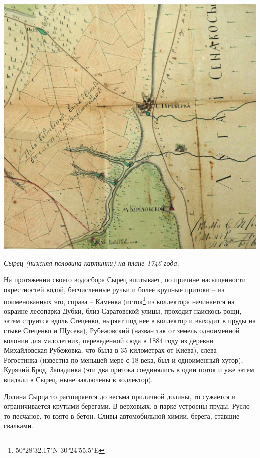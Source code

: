 \begin{center}
\includegraphics[width=\linewidth]{chast-colebanie-osnov/pochayna/1746-syrec.jpg}

\textit{Сырец (нижняя половина картинки) на плане 1746 года.}
\end{center}

На протяжении своего водосбора Сырец впитывает, по причине насыщенности окрестностей водой, бесчисленные ручьи и более крупные притоки – из поименованных это, справа – Каменка (исток\footnote{50°28'32.17"N 30°24'55.5"E} из коллектора начинается на окраине лесопарка Дубки, близ Саратовской улицы, проходит наискось рощи, затем струится вдоль Стеценко, ныряет под нее в коллектор и выходит в пруды на стыке Стеценко и Щусева), Рубежовский (назван так от земель одноименной колонии для малолетних, переведенной сюда в 1884 году из деревни Михайловская Рубежовка, что была в 35 километрах от Киева), слева – Рогостинка (известна по меньшей мере с 18 века, был и одноименный хутор), Курячий Брод, Западинка (эти два притока соединялись в один поток и уже затем впадали в Сырец, ныне заключены в коллектор). 

Долина Сырца то расширяется до весьма приличной долины, то сужается и ограничивается крутыми берегами. В верховьях, в парке устроены пруды. Русло то песчаное, то взято в бетон. Сливы автомобильной химии, берега, ставшие свалками.

